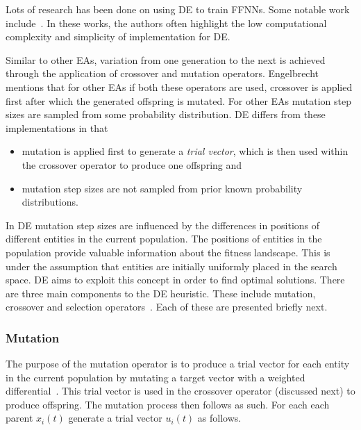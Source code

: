 Lots of research has been done on using \ac{DE} to train \acp{FFNN}. Some notable work include~\cite{ref:ilonen:2003}\cite{ref:slowik:2008}\cite{ref:mingguang:2009}. In these works, the authors often highlight the low computational complexity and simplicity of implementation for \ac{DE}.

Similar to other \acp{EA}, variation from one generation to the next is achieved through the application of crossover and mutation operators. Engelbrecht~\cite{ref:engelbrecht:2007} mentions that for other \acp{EA} if both these operators are used, crossover is applied first after which the generated offspring is mutated. For other \acp{EA} mutation step sizes are sampled from some probability distribution. \ac{DE} differs from these implementations in that

\begin{itemize}
      \item mutation is applied first to generate a \textit{trial vector}, which is then used within the crossover operator to produce one offspring and
      \item mutation step sizes are not sampled from prior known probability distributions.
\end{itemize}

In \ac{DE} mutation step sizes are influenced by the differences in positions of different entities in the current population. The positions of entities in the population provide valuable information about the fitness landscape. This is under the assumption that entities are initially uniformly placed in the search space. \ac{DE} aims to exploit this concept in order to find optimal solutions. There are three main components to the \acs{DE} heuristic. These include mutation, crossover and selection operators~\cite{ref:price:2006}. Each of these are presented briefly next.

\subsubsection{Mutation}
\label{sec:heuristics:mh:de:mutation}

The purpose of the mutation operator is to produce a trial vector for each entity in the current population by mutating a target vector with a weighted differential~\cite{ref:engelbrecht:2007}. This trial vector is used in the crossover operator (discussed next) to produce offspring. The mutation process then follows as such. For each each parent $x_{i}(t)$ generate a trial vector $u_{i}(t)$ as follows.

